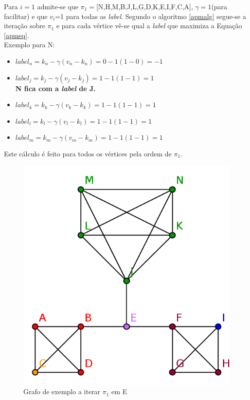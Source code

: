   Para $i=1$ admite-se que $\pi_1=$[N,H,M,B,J,L,G,D,K,E,I,F,C,A], $\gamma=1$(para facilitar) e que $v_i$=1 para todas as \textit{label}. Segundo o algoritmo \ref{apmalg} segue-se a iteração sobre $\pi_1$ e para cada vértice vê-se qual a \textit{label} que maximiza a Equação \ref{apmeq}. 
  \\[0.25cm]
  Exemplo para N:\\
  \begin{itemize}
   \item $label_n = k_n - \gamma ( v_n - k_n ) = 0 - 1 ( 1 - 0) = -1$
   \item $label_j = k_j - \gamma ( v_j - k_j ) = 1 - 1 ( 1 - 1) = 1$\\
   {\bf N fica com a \textit{label} de J.}
   \item $label_k = k_k - \gamma ( v_k - k_k ) = 1 - 1 ( 1 - 1) = 1$
   \item $label_l = k_l - \gamma ( v_l - k_l ) = 1 - 1 ( 1 - 1) = 1$ 
   \item $label_m = k_m - \gamma ( v_m - k_m ) = 1 - 1 ( 1 - 1) = 1$
  \end{itemize}
  Este cálculo é feito para todos os vértices pela ordem de $\pi_1$.  \\[0.25cm]
  \begin{figure}[H]
    \center
    \includegraphics{graph_stepAtE.png}
    \caption{Grafo de exemplo a iterar $\pi_1$ em E}
    \label{graphEllp}
  \end{figure}
